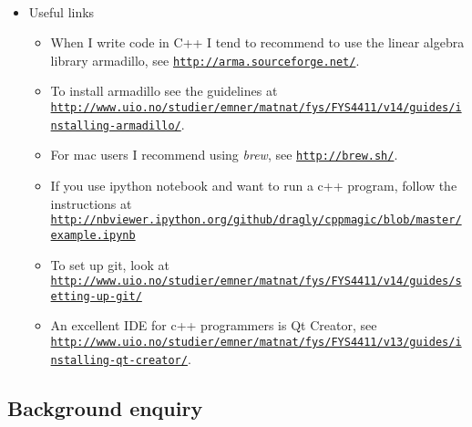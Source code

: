 \documentclass[%
twoside,                 %
final,                   %
10pt]{article}
\begin{document}
\paragraph{}
\begin{itemize}
\item Useful links
\begin{itemize}

 \item When I write code in C++ I tend to recommend to use the linear algebra library armadillo, see \href{{http://arma.sourceforge.net/}}{\nolinkurl{http://arma.sourceforge.net/}}. 

 \item To install armadillo see the guidelines at \href{{http://www.uio.no/studier/emner/matnat/fys/FYS4411/v14/guides/installing-armadillo/}}{\nolinkurl{http://www.uio.no/studier/emner/matnat/fys/FYS4411/v14/guides/installing-armadillo/}}. 

 \item For mac users I recommend using \emph{brew}, see \href{{http://brew.sh/}}{\nolinkurl{http://brew.sh/}}.

 \item If you use ipython notebook and want to run a c++ program, follow the instructions at \href{{http://nbviewer.ipython.org/github/dragly/cppmagic/blob/master/example.ipynb}}{\nolinkurl{http://nbviewer.ipython.org/github/dragly/cppmagic/blob/master/example.ipynb}}

 \item To set up git, look at \href{{http://www.uio.no/studier/emner/matnat/fys/FYS4411/v14/guides/setting-up-git/}}{\nolinkurl{http://www.uio.no/studier/emner/matnat/fys/FYS4411/v14/guides/setting-up-git/}}

 \item An excellent IDE for c++ programmers is Qt Creator, see \href{{http://www.uio.no/studier/emner/matnat/fys/FYS4411/v13/guides/installing-qt-creator/}}{\nolinkurl{http://www.uio.no/studier/emner/matnat/fys/FYS4411/v13/guides/installing-qt-creator/}}.
\end{itemize}

\noindent
\end{itemize}

\noindent





\subsection{Background enquiry}
\end{document}
